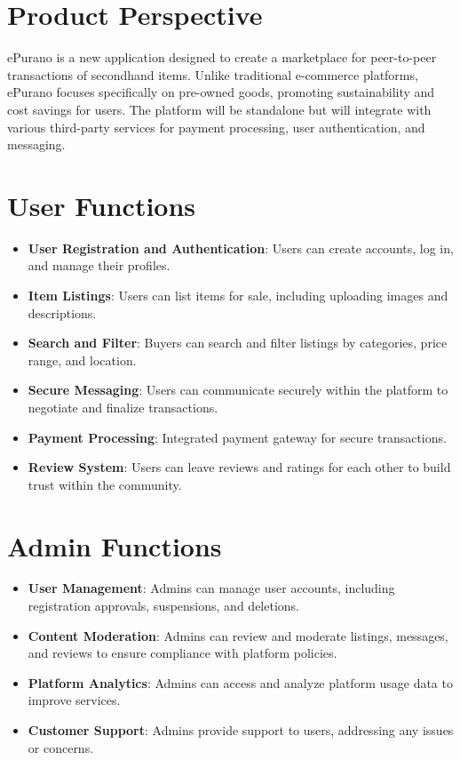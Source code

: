
\section{Product Perspective}

ePurano is a new application designed to create a marketplace for peer-to-peer transactions of secondhand items. Unlike traditional e-commerce platforms, ePurano focuses specifically on pre-owned goods, promoting sustainability and cost savings for users. The platform will be standalone but will integrate with various third-party services for payment processing, user authentication, and messaging.


\section{User Functions}

\begin{itemize}
    \item \textbf{User Registration and Authentication}: Users can create accounts, log in, and manage their profiles.
    \item \textbf{Item Listings}: Users can list items for sale, including uploading images and descriptions.
    \item \textbf{Search and Filter}: Buyers can search and filter listings by categories, price range, and location.
    \item \textbf{Secure Messaging}: Users can communicate securely within the platform to negotiate and finalize transactions.
    \item \textbf{Payment Processing}: Integrated payment gateway for secure transactions.
    \item \textbf{Review System}: Users can leave reviews and ratings for each other to build trust within the community.
\end{itemize}

\section{Admin Functions}

\begin{itemize}
    \item \textbf{User Management}: Admins can manage user accounts, including registration approvals, suspensions, and deletions.
    \item \textbf{Content Moderation}: Admins can review and moderate listings, messages, and reviews to ensure compliance with platform policies.
    \item \textbf{Platform Analytics}: Admins can access and analyze platform usage data to improve services.
    \item \textbf{Customer Support}: Admins provide support to users, addressing any issues or concerns.
\end{itemize}

